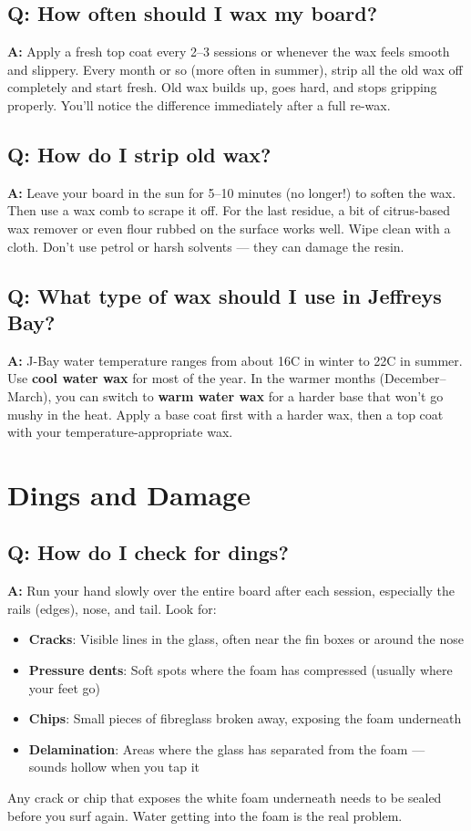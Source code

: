 \documentclass[11pt,a4paper]{article}
\newcommand{\question}[1]{\subsection*{Q: #1}}
\newcommand{\answer}{\noindent\textbf{A:} }
\begin{document}
\question{How often should I wax my board?}
\answer Apply a fresh top coat every 2--3 sessions or whenever the wax feels smooth and slippery. Every month or so (more often in summer), strip all the old wax off completely and start fresh. Old wax builds up, goes hard, and stops gripping properly. You'll notice the difference immediately after a full re-wax.

\question{How do I strip old wax?}
\answer Leave your board in the sun for 5--10 minutes (no longer!) to soften the wax. Then use a wax comb to scrape it off. For the last residue, a bit of citrus-based wax remover or even flour rubbed on the surface works well. Wipe clean with a cloth. Don't use petrol or harsh solvents --- they can damage the resin.

\question{What type of wax should I use in Jeffreys Bay?}
\answer J-Bay water temperature ranges from about 16\textdegree C in winter to 22\textdegree C in summer. Use \textbf{cool water wax} for most of the year. In the warmer months (December--March), you can switch to \textbf{warm water wax} for a harder base that won't go mushy in the heat. Apply a base coat first with a harder wax, then a top coat with your temperature-appropriate wax.

\section{Dings and Damage}

\question{How do I check for dings?}
\answer Run your hand slowly over the entire board after each session, especially the rails (edges), nose, and tail. Look for:
\begin{itemize}[leftmargin=1.5em]
    \item \textbf{Cracks}: Visible lines in the glass, often near the fin boxes or around the nose
    \item \textbf{Pressure dents}: Soft spots where the foam has compressed (usually where your feet go)
    \item \textbf{Chips}: Small pieces of fibreglass broken away, exposing the foam underneath
    \item \textbf{Delamination}: Areas where the glass has separated from the foam --- sounds hollow when you tap it
\end{itemize}
Any crack or chip that exposes the white foam underneath needs to be sealed before you surf again. Water getting into the foam is the real problem.
\end{document}
